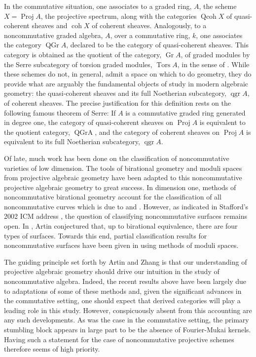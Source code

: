 In the commutative situation, one associates to a graded ring, \(A\), the scheme \(X = \operatorname{Proj} A\), the projective spectrum, along with the categories \(\operatorname{Qcoh} X\) of quasi-coherent sheaves and \(\operatorname{coh} X\) of coherent sheaves.
Analogously, to a noncommutative graded algebra, \(A\), over a commutative ring, \(k\), one associates the category \(\operatorname{QGr} A\), declared to be the category of quasi-coherent sheaves.
This category is obtained as the quotient of the category, \(\operatorname{Gr} A\), of graded modules by the Serre subcategory of torsion graded modules, \(\operatorname{Tors} A\), in the sense of \textcite{DCA62}.
While these schemes do not, in general, admit a space on which to do geometry, they do provide what are arguably the fundamental objects of study in modern algebraic geometry: the quasi-coherent sheaves and its full Noetherian subcategory, \(\operatorname{qgr} A\), of coherent sheaves.
The  precise justification for this definition rests on the following famous theorem of Serre: If \(A\) is a commutative graded ring generated in degree one, the category of quasi-coherent sheaves on \(\operatorname{Proj} A\) is equivalent to the quotient category, \(\operatorname{QGr A}\), and the category of coherent sheaves on \(\operatorname{Proj} A\) is equivalent to its full Noetherian subcategory, \(\operatorname{qgr} A\).

Of late, much work has been done on the classification of noncommutative varieties of low dimension.
The tools of birational geometry and moduli spaces from projective algebraic geometry have been adapted to this noncommutative projective algebraic geometry to great success.
In dimension one, methods of noncommutative birational geometry account for the classification of all noncommutative curves which is due to \textcite{AS95} and \textcite{Reiten-VdB02}.
However, as indicated in Stafford's 2002 ICM address \parencite{Stafford02}, the question of classifying noncommutative surfaces remains open.
In \textcite{Artin97}, Artin conjectured that, up to birational equivalence, there are four types of surfaces.
Towards this end, partial classification results for noncommutative surfaces have been given in \textcite{ATV90,Stephenson96,Stephenson97} using methods of moduli spaces.

The guiding principle set forth by Artin and Zhang is that our understanding of projective algebraic geometry should drive our intuition in the study of noncommutative algebra.
Indeed, the recent results above have been largely due to adaptations of some of these methods and, given the significant advances in the commutative setting, one should expect that derived categories will play a leading role in this study.
However, conspicuously absent from this accounting are any such developments.
As was the case in the commutative setting, the primary stumbling block appears in large part to be the absence of Fourier-Mukai kernels.
Having such a statement for the case of noncommutative projective schemes therefore seems of high priority.
